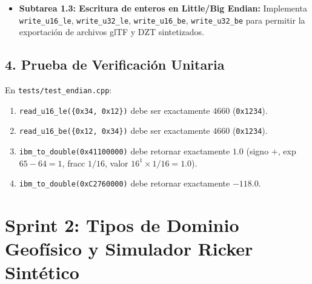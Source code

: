 \documentclass[11pt,a4paper]{article}
\begin{document}
\begin{itemize}
\begin{quote}
\begin{verbatim}
    double factor = 1.0;
    if (exponent >= 0) {
        for (int i = 0; i < exponent; ++i) factor *= 16.0;
    } else {
        for (int i = 0; i < -exponent; ++i) factor /= 16.0;
    }
    return sign * frac_val * factor;
}
\end{verbatim}
\end{quote}

    \item \textbf{Subtarea 1.3: Escritura de enteros en Little/Big Endian:}
    Implementa \texttt{write\_u16\_le}, \texttt{write\_u32\_le}, \texttt{write\_u16\_be}, \texttt{write\_u32\_be} para permitir la exportación de archivos glTF y DZT sintetizados.
\end{itemize}

\subsection{4. Prueba de Verificación Unitaria}
En \texttt{tests/test\_endian.cpp}:
\begin{enumerate}
    \item \texttt{read\_u16\_le(\{0x34, 0x12\})} debe ser exactamente $4660$ (\texttt{0x1234}).
    \item \texttt{read\_u16\_be(\{0x12, 0x34\})} debe ser exactamente $4660$ (\texttt{0x1234}).
    \item \texttt{ibm\_to\_double(0x41100000)} debe retornar exactamente $1.0$ (signo $+$, exp $65-64=1$, fracc $1/16$, valor $16^1 \times 1/16 = 1.0$).
    \item \texttt{ibm\_to\_double(0xC2760000)} debe retornar exactamente $-118.0$.
\end{enumerate}

\section{Sprint 2: Tipos de Dominio Geofísico y Simulador Ricker Sintético}
\end{document}
